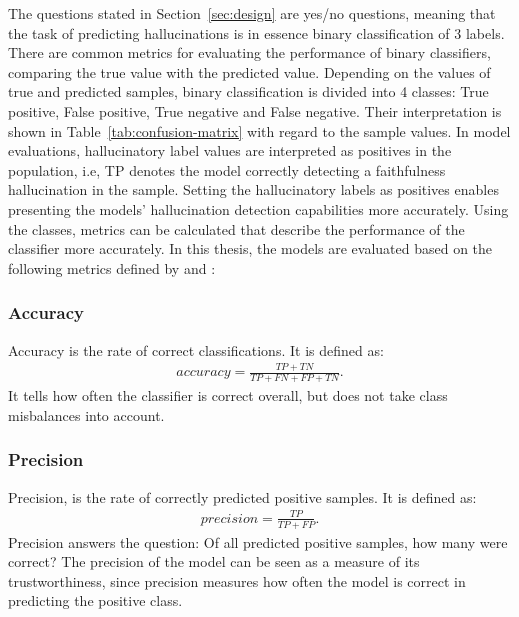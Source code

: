 \documentclass[english, 12pt, a4paper, sci, utf8, a-2b, online]{latex/definitions/aaltothesis}
\begin{document}
The questions stated in Section~\ref{sec:design} are yes/no questions, meaning that the task of predicting hallucinations is in essence binary classification of 3 labels. There are common metrics for evaluating the performance of binary classifiers, comparing the true value with the predicted value. Depending on the values of true and predicted samples, binary classification is divided into 4 classes: True positive, False positive, True negative and False negative. Their interpretation is shown in Table~\ref{tab:confusion-matrix} with regard to the sample values. In model evaluations, hallucinatory label values are interpreted as positives in the population, i.e, TP denotes the model correctly detecting a faithfulness hallucination in the sample. Setting the hallucinatory labels as positives enables presenting the models' hallucination detection capabilities more accurately. Using the classes, metrics can be calculated that describe the performance of the classifier more accurately. In this thesis, the models are evaluated based on the following metrics defined by \textcite{Fawcett2006-aj} and \textcite{6790639}:

\begin{table}
    \centering
    \renewcommand{\arraystretch}{1.3}
    
    \caption{Confusion matrix for binary classification}
    \label{tab:confusion-matrix}
\end{table}

\subsubsection*{Accuracy} 
Accuracy is the rate of correct classifications. It is defined as:
\begin{align*}
    accuracy = \frac{TP + TN}{TP + FN + FP + TN}.
\end{align*}
It tells how often the classifier is correct overall, but does not take class misbalances into account.
\subsubsection*{Precision}
Precision, is the rate of correctly predicted positive samples. It is defined as:
\begin{align*}
    precision = \frac{TP}{TP + FP}.
\end{align*}
Precision answers the question: Of all predicted positive samples, how many were correct? The precision of the model can be seen as a measure of its trustworthiness, since precision measures how often the model is correct in predicting the positive class. 
\end{document}
